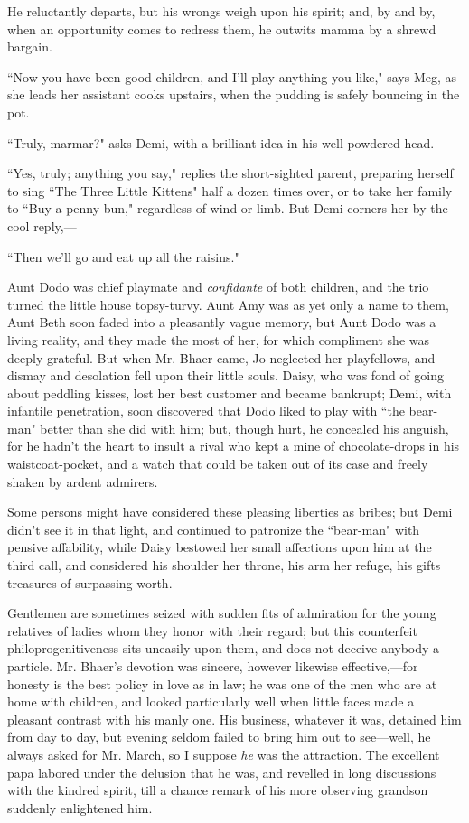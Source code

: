 He reluctantly departs, but his wrongs weigh upon his spirit; and, by
and by, when an opportunity comes to redress them, he outwits mamma by a
shrewd bargain.

``Now you have been good children, and I'll play anything
you like," says Meg, as she leads her assistant cooks upstairs, when the
pudding is safely bouncing in the pot.

``Truly, marmar?" asks Demi, with a brilliant idea in his well-powdered
head.

``Yes, truly; anything you say," replies the short-sighted parent,
preparing herself to sing ``The Three Little Kittens" half a dozen times
over, or to take her family to ``Buy a penny bun," regardless of wind or
limb. But Demi corners her by the cool reply,---

``Then we'll go and eat up all the raisins."

Aunt Dodo was chief playmate and \emph{confidante} of both children, and
the trio turned the little house topsy-turvy. Aunt Amy was as yet only a
name to them, Aunt Beth soon faded into a pleasantly vague memory, but
Aunt Dodo was a living reality, and they made the most of her, for which
compliment she was deeply grateful. But when Mr. Bhaer came, Jo
neglected her playfellows, and dismay and desolation fell upon their
little souls. Daisy, who was fond of going about peddling kisses, lost
her best customer and became bankrupt; Demi, with infantile penetration,
soon discovered that Dodo liked to play with ``the bear-man" better than
she did with him; but, though hurt, he concealed his anguish, for he
hadn't the heart to insult a rival who kept a mine of
chocolate-drops in his waistcoat-pocket, and a watch that could be taken
out of its case and freely shaken by ardent admirers.

Some persons might have considered these pleasing liberties as bribes;
but Demi didn't see it in that light, and continued to
patronize the ``bear-man" with pensive affability, while Daisy bestowed
her small affections upon him at the third call, and considered his
shoulder her throne, his arm her refuge, his gifts treasures of
surpassing worth.

Gentlemen are sometimes seized with sudden fits of admiration for the
young relatives of ladies whom they honor with their regard; but this
counterfeit philoprogenitiveness sits uneasily upon them, and does not
deceive anybody a particle. Mr. Bhaer's devotion was
sincere, however likewise effective,---for honesty is the best policy in
love as in law; he was one of the men who are at home with children, and
looked particularly well when little faces made a pleasant contrast with
his manly one. His business, whatever it was, detained him from day to
day, but evening seldom failed to bring him out to see---well, he always
asked for Mr. March, so I suppose \emph{he} was the attraction. The
excellent papa labored under the delusion that he was, and revelled in
long discussions with the kindred spirit, till a chance remark of his
more observing grandson suddenly enlightened him.

